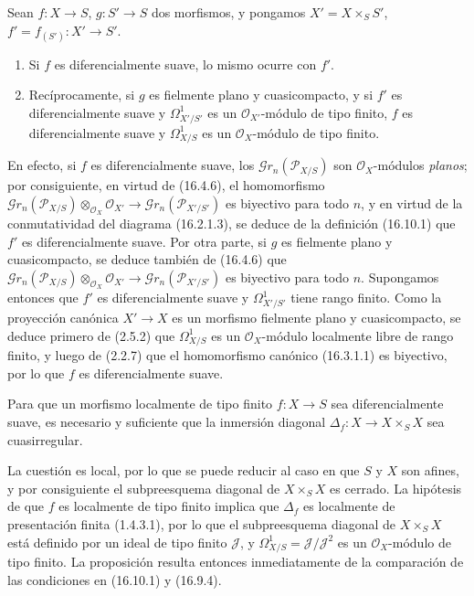 \begin{proposition}[16.10.4]
\label{IV.16.10.4}
Sean $f:X\to S$, $g:S'\to S$ dos morfismos, y pongamos
$X'=X\times_S S'$, $f'=f_{(S')}:X'\to S'$.
\begin{enumerate}
  \item[\textup{(i)}] Si $f$ es diferencialmente suave, lo mismo ocurre con $f'$.
  \item[\textup{(ii)}] Recíprocamente, si $g$ es fielmente plano y cuasicompacto, y si
  $f'$ es diferencialmente suave y $\varOmega_{X'/S'}^1$ es un
  $\mathcal{O}_{X'}$-módulo de tipo finito, $f$ es diferencialmente suave y
  $\varOmega_{X/S}^1$ es un $\mathcal{O}_X$-módulo de tipo finito.
\end{enumerate}
\end{proposition}

En efecto, si $f$ es diferencialmente suave, los
$\mathscr{G}r_n(\mathscr{P}_{X/S})$ son $\mathcal{O}_X$-módulos
\emph{planos}; por consiguiente, en virtud de (16.4.6), el homomorfismo
$\mathscr{G}r_n(\mathscr{P}_{X/S})\otimes_{\mathcal{O}_X}\mathcal{O}_{X'}\to\mathscr{G}r_n(\mathscr{P}_{X'/S'})$
es biyectivo para todo $n$, y en virtud de la conmutatividad del diagrama
(16.2.1.3), se deduce de la definición (16.10.1) que $f'$ es
diferencialmente suave. Por otra parte, si $g$ es fielmente plano y
cuasicompacto, se deduce también de (16.4.6) que
$\mathscr{G}r_n(\mathscr{P}_{X/S})\otimes_{\mathcal{O}_X}\mathcal{O}_{X'}\to\mathscr{G}r_n(\mathscr{P}_{X'/S'})$
es biyectivo para todo $n$. Supongamos entonces que $f'$ es diferencialmente suave y
$\varOmega_{X'/S'}^1$ tiene rango finito. Como la proyección canónica $X'\to X$ es
un morfismo fielmente plano y cuasicompacto, se deduce primero de (2.5.2)
que $\varOmega_{X/S}^1$ es un $\mathcal{O}_X$-módulo localmente libre de rango
finito, y luego de (2.2.7) que el homomorfismo canónico (16.3.1.1) es biyectivo,
por lo que $f$ es diferencialmente suave.

\begin{proposition}[16.10.5]
\label{IV.16.10.5}
Para que un morfismo localmente de tipo finito $f:X\to S$ sea
diferencialmente suave, es necesario y suficiente que la inmersión diagonal
$\Delta_f:X\to X\times_S X$ sea cuasirregular.
\end{proposition}


La cuestión es local, por lo que se puede reducir al caso en que $S$ y $X$
son afines, y por consiguiente el subpreesquema diagonal de $X\times_S X$ es
cerrado. La hipótesis de que $f$ es localmente de tipo finito implica que
$\Delta_f$ es localmente de presentación finita (1.4.3.1), por lo que el
subpreesquema diagonal de $X\times_S X$ está definido por un ideal de tipo
finito $\mathscr{J}$, y $\varOmega_{X/S}^1=\mathscr{J}/\mathscr{J}^2$ es un
$\mathcal{O}_X$-módulo de tipo finito. La proposición resulta entonces
inmediatamente de la comparación de las condiciones en (16.10.1) y (16.9.4).

